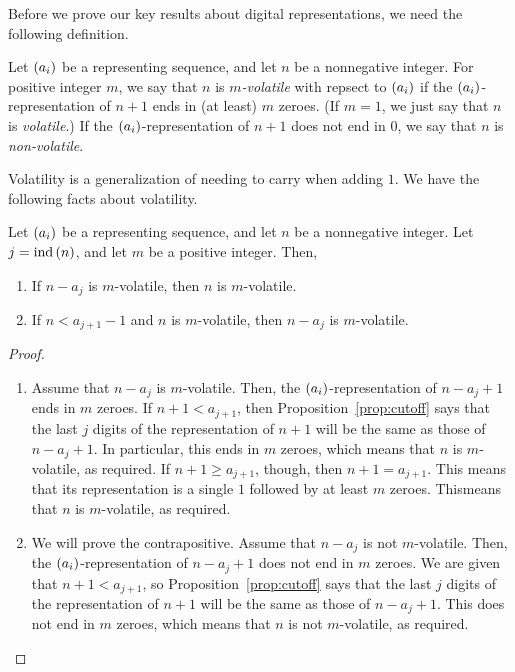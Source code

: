\documentclass[english,12pt]{article}
\newcommand{\seq}{\p}
\DeclareMathOperator{\ind}{ind}
\begin{document}
Before we prove our key results about digital representations, we need the following definition.
\begin{defin}
Let $\seq{a_i}$ be a representing sequence, and let $n$ be a nonnegative integer.  For positive integer $m$, we say that $n$ is \emph{$m$-volatile} with repsect to $\seq{a_i}$ if the $\seq{a_i}$-representation of $n+1$ ends in (at least) $m$ zeroes.  (If $m=1$, we just say that $n$ is \emph{volatile}.)  If the $\seq{a_i}$-representation of $n+1$ does not end in $0$, we say that $n$ is \emph{non-volatile}.
\end{defin}
Volatility is a generalization of needing to carry when adding $1$.
We have the following facts about volatility.
\begin{prop}\label{prop:vprez}
Let $\seq{a_i}$ be a representing sequence, and let $n$ be a nonnegative integer.  Let $j=\ind\p{n}$, and let $m$ be a positive integer.  Then,
\begin{enumerate}
\item If $n-a_j$ is $m$-volatile, then $n$ is $m$-volatile.
\item If $n<a_{j+1}-1$ and $n$ is $m$-volatile, then $n-a_j$ is $m$-volatile.
\end{enumerate}
\end{prop}
\begin{proof}\lb
\begin{enumerate}
\item Assume that $n-a_j$ is $m$-volatile.  Then, the $\seq{a_i}$-representation of $n-a_j+1$ ends in $m$ zeroes.  If $n+1<a_{j+1}$, then Proposition~\ref{prop:cutoff} says that the last $j$ digits of the representation of $n+1$ will be the same as those of $n-a_j+1$.  In particular, this ends in $m$ zeroes, which means that $n$ is $m$-volatile, as required.  If $n+1\geq a_{j+1}$, though, then $n+1=a_{j+1}$.  This means that its representation is a single $1$ followed by at least $m$ zeroes.  Thismeans that $n$ is $m$-volatile, as required.
\item We will prove the contrapositive.  Assume that $n-a_j$ is not $m$-volatile.  Then, the $\seq{a_i}$-representation of $n-a_j+1$ does not end in $m$ zeroes.  We are given that $n+1<a_{j+1}$, so Proposition~\ref{prop:cutoff} says that the last $j$ digits of the representation of $n+1$ will be the same as those of $n-a_j+1$.  This does not end in $m$ zeroes, which means that $n$ is not $m$-volatile, as required.
\end{enumerate}
\end{proof}
\end{document}

